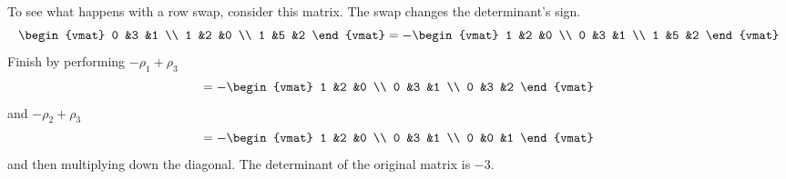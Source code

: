 \documentclass[10pt,t]{beamer}
\begin{document}
\begin{frame}
\ex
To see what happens with a row swap,
consider this matrix. 
The swap changes the determinant's sign.
\begin{equation*}
  \begin{vmat}
    0  &3  &1 \\
    1  &2  &0 \\
    1  &5  &2
  \end{vmat}
  =
  -\begin{vmat}
    1  &2  &0 \\
    0  &3  &1 \\
    1  &5  &2
  \end{vmat}
\end{equation*}
Finish by performing $-\rho_1+\rho_3$
\begin{equation*}
  =-\begin{vmat}
    1  &2  &0 \\
    0  &3  &1 \\
    0  &3  &2
  \end{vmat}
\end{equation*}
and $-\rho_2+\rho_3$
\begin{equation*}
  =-\begin{vmat}
    1  &2  &0 \\
    0  &3  &1 \\
    0  &0  &1
  \end{vmat}
\end{equation*}
and then multiplying down the diagonal.
The determinant of the original matrix is $-3$.
\end{frame}
\end{document}
